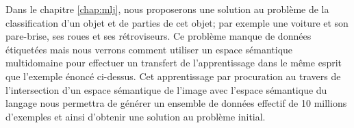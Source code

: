 Dans le chapitre \ref{chap:mlj}, nous proposerons une solution au problème de
la classification d'un objet et de parties de cet objet; par exemple une
voiture et son pare-brise, ses roues et ses rétroviseurs. Ce problème manque de
données étiquetées mais nous verrons comment utiliser un espace sémantique
multidomaine pour effectuer un transfert de l'apprentissage dans le même
esprit que l'exemple énoncé ci-dessus. Cet apprentissage par procuration au travers de
l'intersection d'un espace sémantique de l'image avec l'espace sémantique du
langage nous permettra de générer un ensemble de données effectif de 10 millions d'exemples
et ainsi d'obtenir une solution au problème initial.

